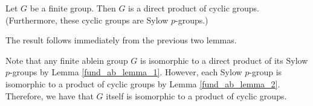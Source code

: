     \begin{thm}
        Let $G$ be a finite group. Then $G$ is a direct product of
        cyclic groups. (Furthermore, these cyclic groups are Sylow $p$-groups.)
    \end{thm}

    \begin{prf}
        The result follows immediately from the previous two lemmas. 

        Note that any finite ablein group $G$ is
        isomorphic to a direct product of its Sylow $p$-groups by Lemma \ref{fund_ab_lemma_1}. 
        However, each Sylow $p$-group is isomorphic to a product of
        cyclic groups by Lemma \ref{fund_ab_lemma_2}. Therefore, we have that $G$ itself is
        isomorphic to a product of cyclic groups. 
    \end{prf}

